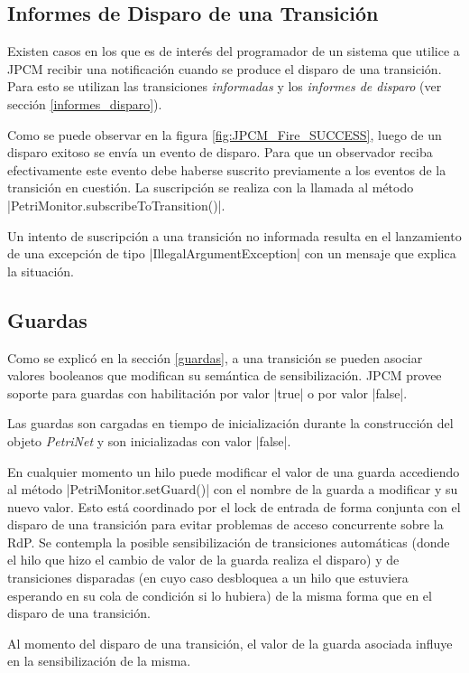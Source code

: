 \subsection{Informes de Disparo de una Transición}

Existen casos en los que es de interés del programador de un sistema que
utilice a JPCM recibir una notificación cuando se produce el disparo de una
transición. Para esto se utilizan las transiciones \textit{informadas} y los
\textit{informes de disparo} (ver sección \ref{informes_disparo}).

Como se puede observar en la figura \ref{fig:JPCM_Fire_SUCCESS}, luego de un
disparo exitoso se envía un evento de disparo. Para que un observador reciba
efectivamente este evento debe haberse suscrito previamente a los eventos de
la transición en cuestión. La suscripción se realiza con la llamada al método
|PetriMonitor.subscribeToTransition()|.

Un intento de suscripción a una transición no informada resulta en el
lanzamiento de una excepción de tipo |IllegalArgumentException| con
un mensaje que explica la situación.

\subsection{Guardas}

Como se explicó en la sección \ref{guardas}, a una transición se pueden asociar
valores booleanos que modifican su semántica de sensibilización. JPCM provee
soporte para guardas con habilitación por valor |true| o por valor
|false|.

Las guardas son cargadas en tiempo de inicialización durante la construcción
del objeto \textit{PetriNet} y son inicializadas con valor |false|.

En cualquier momento un hilo puede modificar el valor de una guarda accediendo
al método |PetriMonitor.setGuard()| con el nombre de la guarda a
modificar y su nuevo valor. Esto está coordinado por el lock de entrada de forma
conjunta con el disparo de una transición para evitar problemas de acceso
concurrente sobre la RdP. Se contempla la posible sensibilización de
transiciones automáticas (donde el hilo que hizo el cambio de valor de la guarda
realiza el disparo) y de transiciones disparadas (en cuyo caso desbloquea a un
hilo que estuviera esperando en su cola de condición si lo hubiera) de la misma
forma que en el disparo de una transición.

Al momento del disparo de una transición, el valor de la guarda asociada
influye en la sensibilización de la misma.

